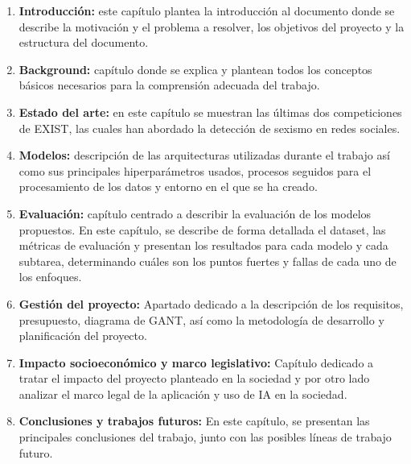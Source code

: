 \begin{enumerate}
    \item \textbf{Introducción:} este capítulo plantea la introducción al documento donde se describe la motivación y el problema a resolver, los objetivos del proyecto y la estructura del documento.
    \item \textbf{Background:} capítulo donde se explica y plantean todos los conceptos básicos necesarios para la comprensión adecuada del trabajo. 
    \item \textbf{Estado del arte:}  en este capítulo se muestran las últimas dos competiciones de EXIST, las cuales han abordado la detección de sexismo en redes sociales.
    \item \textbf{Modelos:} descripción de las arquitecturas utilizadas durante el trabajo así como sus principales hiperparámetros usados, procesos seguidos para el procesamiento de los datos y entorno en el que se ha creado.
    \item \textbf{Evaluación:} capítulo centrado a describir la evaluación de los modelos propuestos. En este capítulo, se describe de forma detallada el dataset, las métricas de evaluación y presentan los resultados para cada modelo y cada subtarea, determinando cuáles son los puntos fuertes y fallas de cada uno de los enfoques.
    \item \textbf{Gestión del proyecto:} Apartado dedicado a la descripción de los requisitos, presupuesto, diagrama de GANT, así como la metodología de desarrollo y planificación del proyecto. 
    \item \textbf{Impacto socioeconómico y marco legislativo:} Capítulo dedicado a tratar el impacto del proyecto planteado en la sociedad y por otro lado analizar el marco legal de la aplicación y uso de IA en la sociedad.
    \item \textbf{Conclusiones y trabajos futuros:} En este capítulo, se presentan las principales conclusiones del trabajo, junto con las posibles líneas de trabajo futuro.
\end{enumerate}